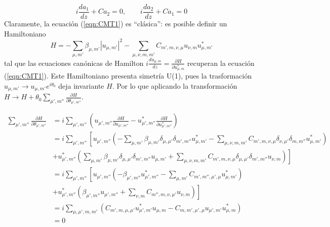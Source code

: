 \begin{equation}
	i\frac{d a_1}{dz} + C a_2 = 0, \quad\quad i\frac{d a_2}{dz} + C a_1 = 0 \nonumber
\end{equation}
Claramente, la ecuación (\ref{eqn:CMT1}) es ``clásica'': es posible definir un Hamiltoniano 
\begin{equation}
	H = -\sum_{\mu, m'} \beta_{\mu, m'} |u_{\mu, m'}|^2 - \sum_{\mu, \nu, m, m'}C_{m', m, \nu, \mu}   u_{\nu, m}u^*_{\mu, m'}
\end{equation}
tal que las ecuaciones canónicas de Hamilton $i\frac{d u_{\mu, m}}{dz} = \frac{\partial H}{\partial u^*_{\mu, m}} $ recuperan la ecuación (\ref{eqn:CMT1}). Este Hamiltoniano presenta simetría U(1), pues la trasformación $u_{\mu, m'} \to u_{\mu, m'}e^{i\theta_0} $ deja invariante $H$. Por lo que aplicando la transformación $H \to H +\theta_0 \sum_{\mu', m''} \frac{\partial H}{\partial \theta_{\mu', m''}}$.

\begin{align*}
	\sum_{\mu', m''} \frac{\partial H}{\partial \theta_{\mu', m''}} &= i\sum_{\mu', m''} \left( u_{\mu', m''}\frac{\partial H}{\partial u_{\mu', m''}} - u_{\mu', m''}^*\frac{\partial H}{\partial u^*_{\mu', m''}}\right)
	\\
	&=
	i \sum_{\mu', m''} \left[ u_{\mu', m''} \left(-\sum_{\mu, m'} \beta_{\mu, m'} \delta_{\mu, \mu'}\delta_{m', m''} u_{\mu, m'}^* - \sum_{\mu, \nu, m, m'}C_{m', m, \nu, \mu}   \delta_{\nu, \mu'}\delta_{m,m''}u^*_{\mu, m'}\right)\right.
	\\
	&+ \left.
	u^*_{\mu', m''} \left(\sum_{\mu, m'} \beta_{\mu, m'} \delta_{\mu, \mu'}\delta_{m', m''} u_{\mu, m'} + \sum_{\mu, \nu, m, m'}C_{m', m, \nu, \mu}   \delta_{\mu, \mu'}\delta_{m',m''}u_{\nu, m}\right)\right]
	\\
	&=
	i \sum_{\mu', m''} \left[ u_{\mu', m''} \left(- \beta_{\mu', m''}  u_{\mu', m''}^* - \sum_{\mu, m'}C_{m', m'', \mu', \mu}   u^*_{\mu, m'}\right)\right.
	\\
	&+ \left.
	u^*_{\mu', m''} \left(\beta_{\mu', m''}  u_{\mu', m''} + \sum_{\nu, m}C_{m'', m, \nu, \mu'}  u_{\nu, m}\right)\right]
	\\
	&=
	i\sum_{\mu, \mu', m, m'} \left(C_{m', m, \mu, \mu'}  u_{\mu', m'}^*u_{\mu, m} - C_{m, m', \mu', \mu}  u_{\mu', m'} u^*_{\mu, m}\right)
	\\
	&= 0
\end{align*}

	
